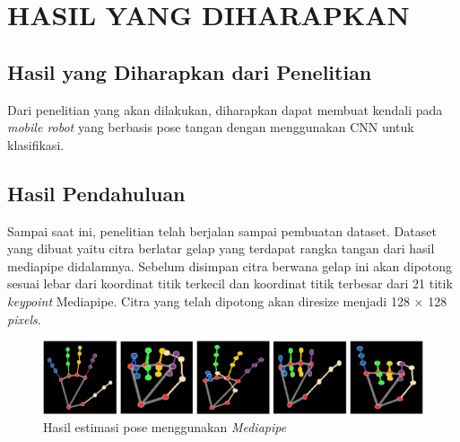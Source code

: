 \section{HASIL YANG DIHARAPKAN}

\subsection{Hasil yang Diharapkan dari Penelitian}

Dari penelitian yang akan dilakukan, diharapkan dapat membuat kendali pada \textit{mobile robot} yang berbasis pose tangan dengan menggunakan CNN untuk klasifikasi.

\subsection{Hasil Pendahuluan}
Sampai saat ini, penelitian telah berjalan sampai pembuatan dataset. Dataset yang dibuat yaitu citra berlatar gelap yang terdapat rangka tangan dari hasil mediapipe didalamnya. Sebelum disimpan citra berwana gelap ini akan dipotong sesuai lebar dari koordinat titik terkecil dan koordinat titik terbesar dari 21 titik \textit{keypoint} Mediapipe. Citra yang telah dipotong akan diresize menjadi 128 $\times$ 128 \textit{pixels}.

\begin{figure}[!h]
	\centering
	\includegraphics[width=1\linewidth]{gambar/hasilpose.png}
	\caption{Hasil estimasi pose menggunakan \textit{Mediapipe}}
	\label{fig:gambar41}
\end{figure}
